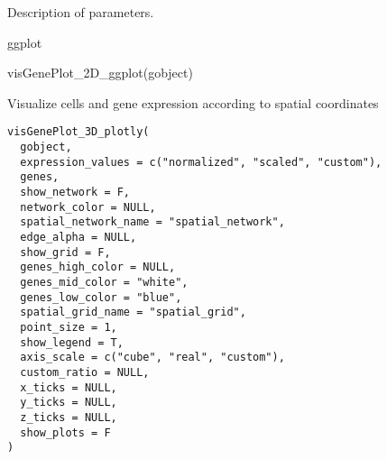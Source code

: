 \documentclass[a4paper]{book}
\begin{document}
%
\begin{Details}\relax
Description of parameters.
\end{Details}
%
\begin{Value}
ggplot
\end{Value}
%
\begin{Examples}
\begin{ExampleCode}
    visGenePlot_2D_ggplot(gobject)
\end{ExampleCode}
\end{Examples}
%
\begin{Description}\relax
Visualize cells and gene expression according to spatial coordinates
\end{Description}
%
\begin{Usage}
\begin{verbatim}
visGenePlot_3D_plotly(
  gobject,
  expression_values = c("normalized", "scaled", "custom"),
  genes,
  show_network = F,
  network_color = NULL,
  spatial_network_name = "spatial_network",
  edge_alpha = NULL,
  show_grid = F,
  genes_high_color = NULL,
  genes_mid_color = "white",
  genes_low_color = "blue",
  spatial_grid_name = "spatial_grid",
  point_size = 1,
  show_legend = T,
  axis_scale = c("cube", "real", "custom"),
  custom_ratio = NULL,
  x_ticks = NULL,
  y_ticks = NULL,
  z_ticks = NULL,
  show_plots = F
)
\end{verbatim}
\end{Usage}
%
\end{document}
